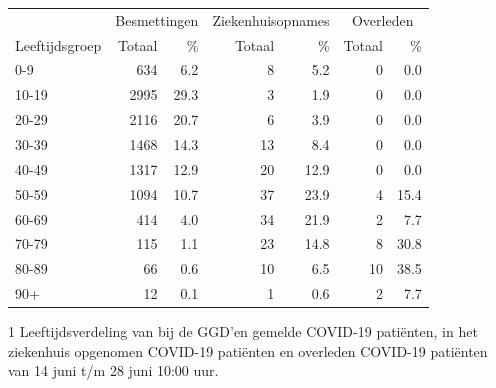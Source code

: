 \documentclass[
  english,
  man,floatsintext]{apa6}
\begin{document}
\begin{table}
\centering\begingroup\fontsize{11}{13}\selectfont

\begin{threeparttable}
\begin{tabular}{lrrrrrr}
\toprule
\multicolumn{1}{c}{ } & \multicolumn{2}{c}{Besmettingen} & \multicolumn{2}{c}{Ziekenhuisopnames} & \multicolumn{2}{c}{Overleden} \\
\cmidrule(l{3pt}r{3pt}){2-3} \cmidrule(l{3pt}r{3pt}){4-5} \cmidrule(l{3pt}r{3pt}){6-7}
Leeftijdsgroep & Totaal & \% & Totaal & \% & Totaal & \%\\
\midrule
0-9 & 634 & 6.2 & 8 & 5.2 & 0 & 0.0\\
10-19 & 2995 & 29.3 & 3 & 1.9 & 0 & 0.0\\
20-29 & 2116 & 20.7 & 6 & 3.9 & 0 & 0.0\\
30-39 & 1468 & 14.3 & 13 & 8.4 & 0 & 0.0\\
40-49 & 1317 & 12.9 & 20 & 12.9 & 0 & 0.0\\
50-59 & 1094 & 10.7 & 37 & 23.9 & 4 & 15.4\\
60-69 & 414 & 4.0 & 34 & 21.9 & 2 & 7.7\\
70-79 & 115 & 1.1 & 23 & 14.8 & 8 & 30.8\\
80-89 & 66 & 0.6 & 10 & 6.5 & 10 & 38.5\\
90+ & 12 & 0.1 & 1 & 0.6 & 2 & 7.7\\
\bottomrule
\end{tabular}
\begin{tablenotes}
\item[1] Leeftijdsverdeling van bij de GGD’en gemelde COVID-19 patiënten, in het ziekenhuis opgenomen COVID-19 patiënten en overleden COVID-19 patiënten van 14 juni t/m 28 juni 10:00 uur.
\end{tablenotes}
\end{threeparttable}
\endgroup{}
\end{table}

\newpage
\end{document}
